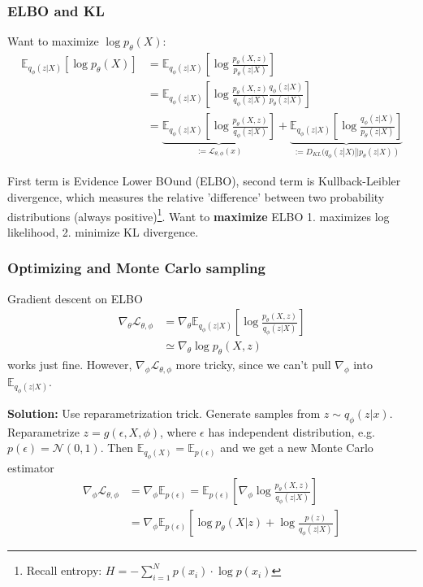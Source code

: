 \documentclass{beamer}
\newcommand{\cN}{\mathcal{N}}
\begin{document}
\begin{frame}
\frametitle{ELBO and KL}
Want to maximize $\log p_\theta (X)$:
\begin{align}
	 \mathbb{E}_{q_\phi (z|X)} [\log p_\theta (X)] &= \mathbb{E}_{q_\phi (z|X)} \left[\log \frac{p_\theta (X,z)}{p_\theta (z|X)} \right] \nonumber \\ %
	& =  \mathbb{E}_{q_\phi (z|X)} \left[\log \frac{p_\theta (X,z)}{q_\phi (z|X)} \frac{q_\phi (z|X)}{p_\theta (z|X)} \right] \nonumber \\
	& =  \underbrace{\mathbb{E}_{q_\phi (z|X)} \left[\log \frac{p_\theta (X,z)}{q_\phi (z|X)}\right] }_{:= \mathcal{L}_{\theta, \phi} (x)} + \underbrace{\mathbb{E}_{q_\phi (z|X)} \left[\log \frac{q_\phi (z|X)}{p_\theta (z|X)}\right] }_{:= D_{KL} (q_\phi (z|X) || p_\theta (z|X))}
\end{align}

\pause
First term is Evidence Lower BOund (ELBO), second term is Kullback-Leibler divergence, which measures the relative 'difference' between two probability distributions (always positive)\footnote{Recall entropy:
$
	H = - \sum_{i=1}^{N} p(x_i) \cdot \log p(x_i)
$}. Want to \textbf{maximize} ELBO 1. maximizes log likelihood, 2. minimize KL divergence.
\end{frame}

\begin{frame}
\frametitle{Optimizing and Monte Carlo sampling}
Gradient descent on ELBO
\begin{align}
	\nabla_\theta \mathcal{L}_{\theta, \phi} &= \nabla_\theta \mathbb{E}_{q_\phi (z|X)} \left[\log \frac{p_\theta (X,z)}{q_\phi (z|X)}\right] \nonumber \\
	& \simeq \nabla_\theta \log p_\theta (X,z)
\end{align}
works just fine. However, $\nabla_\phi \mathcal{L}_{\theta, \phi}$ more tricky, since we can't pull $\nabla_\phi$ into $\mathbb{E}_{q_\phi (z|X)}$.

\pause
\textbf{Solution:} Use reparametrization trick. Generate samples from $z \sim q_\phi (z|x)$. Reparametrize $z = g(\epsilon,X,\phi)$, where $\epsilon$ has independent distribution, e.g. $p(\epsilon) = \cN (0,1)$. Then $\mathbb{E}_{q_\phi (X)} = \mathbb{E}_{p(\epsilon)}$ and we get a new Monte Carlo estimator
\begin{align}
\nabla_\phi \mathcal{L}_{\theta, \phi} &= \nabla_\phi \mathbb{E}_{p(\epsilon)} = \mathbb{E}_{p(\epsilon)} \left[ \nabla_\phi\log \frac{p_\theta (X,z)}{q_\phi (z|X)} \right] \nonumber \\
& = \nabla_\phi \mathbb{E}_{p(\epsilon)}  \left[ \log p_\theta(X|z) +  \log \frac{p(z)}{q_\phi (z|X)}\right]
\end{align}
\end{frame}
\end{document}
